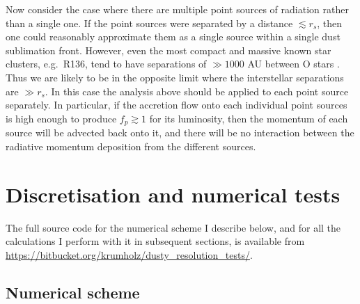\documentclass[useAMS,usenatbib]{mn2e}
\begin{document}
Now consider the case where there are multiple point sources of radiation rather than a single one. If the point sources were separated by a distance $\lesssim r_s$, then one could reasonably approximate them as a single source within a single dust sublimation front. However, even the most compact and massive known star clusters, e.g.~R136, tend to have separations of $\gg 1000$ AU between O stars \citep[e.g.,][]{massey98b}. Thus we are likely to be in the opposite limit where the interstellar separations are $\gg r_s$. In this case the analysis above should be applied to each point source separately. In particular, if the accretion flow onto each individual point sources is high enough to produce $f_p \gtrsim 1$ for its luminosity, then the momentum of each source will be advected back onto it, and there will be no interaction between the radiative momentum deposition from the different sources.


\section{Discretisation and numerical tests}
\label{sec:simulations}

The full source code for the numerical scheme I describe below, and for all the calculations I perform with it in subsequent sections, is available from \url{https://bitbucket.org/krumholz/dusty_resolution_tests/}.

\subsection{Numerical scheme}
\label{ssec:scheme}
\end{document}
